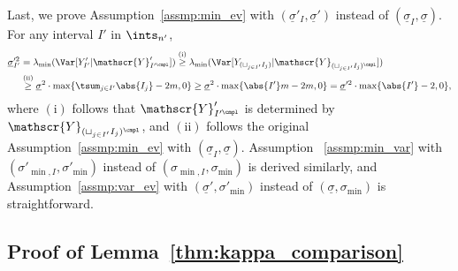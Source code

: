 \documentclass[aos]{imsart}
\begin{document}
\begin{appendix}
Last, we prove Assumption~\eqref{assmp:min_ev} with $(\underline{\sigma}'_I, \underline{\sigma}')$ instead of $(\underline{\sigma}_I, \underline{\sigma})$. For any interval $I'$ in $\ints_{n'}$, 
\begin{equation*}
\begin{aligned}
    \underline{\sigma}'^2_{I'}
    & = \lambda_{\min}(\Var[Y'_{I'} | \mathscr{Y}'_{I'^\cmpl}])
    \overset{\mathrm{(i)}}{\geq} \lambda_{\min}(\Var[Y_{(\sqcup_{j \in I'} I_j)} | \mathscr{Y}_{(\sqcup_{j \in I'} I_j)^\cmpl}]) \\
    & \overset{\mathrm{(ii)}}{\geq} \underline{\sigma}^2 \cdot \max\{ \tsum_{j \in I'} \abs{I_j} - 2m, 0\}
    \geq \underline{\sigma}^2 \cdot \max\{ \abs{I'} m - 2m, 0 \}
    = \underline{\sigma}'^2 \cdot \max\{ \abs{I'} - 2, 0 \},
\end{aligned}
\end{equation*}
where $\mathrm{(i)}$ follows that $\mathscr{Y}'_{I'^\cmpl}$ is determined by $\mathscr{Y}_{(\sqcup_{j \in I'} I_j)^\cmpl}$, and $\mathrm{(ii)}$ follows the original Assumption~\eqref{assmp:min_ev} with $(\underline{\sigma}_I, \underline{\sigma})$. Assumption ~\eqref{assmp:min_var} with $(\sigma'_{\min,I}, \sigma'_{\min})$ instead of $(\sigma_{\min,I}, \sigma_{\min})$ is derived similarly, and Assumption~\eqref{assmp:var_ev} with $(\underline{\sigma}', \sigma'_{\min})$ instead of $(\underline{\sigma}, \sigma_{\min})$ is straightforward.


\subsection{Proof of Lemma~\ref{thm:kappa_comparison}}


\end{appendix}
\end{document}
